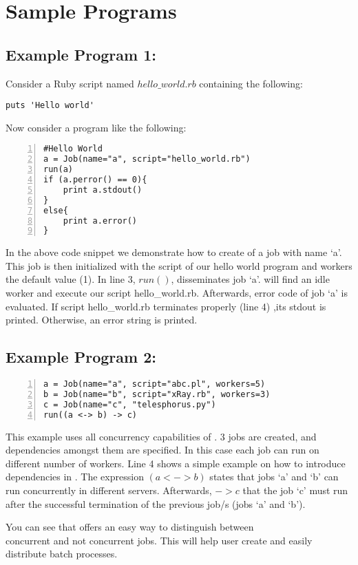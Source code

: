 \section{Sample Programs}
\label{sect:samples}
\subsection*{Example Program 1:}
Consider a Ruby script named $hello\_world.rb$ containing the following:
\begin{verbatim}
puts 'Hello world'
\end{verbatim}
Now consider a \lang{} program like the following:
\begin{Verbatim}[numbers=left]
#Hello World
a = Job(name="a", script="hello_world.rb")
run(a)
if (a.perror() == 0){
    print a.stdout()
}
else{
    print a.error()
}
\end{Verbatim}

In the above code snippet we demonstrate how to create of a job with name `a'.
This job is then initialized with the script of our hello world program and
workers the default value (1). In line 3, $run()$, disseminates job `a'. 
\lang{} will find an idle worker and execute our script hello\_world.rb.
Afterwards, error code of job `a' is evaluated. If script hello\_world.rb terminates properly (line 4)
,its stdout is printed. Otherwise, an error string is printed.

\subsection*{Example Program 2:}
\begin{Verbatim}[numbers=left]
a = Job(name="a", script="abc.pl", workers=5)
b = Job(name="b", script="xRay.rb", workers=3)
c = Job(name="c", "telesphorus.py")
run((a <-> b) -> c)
\end{Verbatim}

This example uses all concurrency capabilities of \lang{}.
3 jobs are created, and dependencies amongst them are specified.
In this case each job can run on different number of workers.
Line 4  shows a simple example on how to introduce dependencies in \lang{}.
The expression $(a <-> b)$ states that jobs `a' and `b' can
run concurrently in different servers. Afterwards,  $-> c$ that the job `c' must run after the successful termination
of the previous job/s (jobs `a' and `b').

You can see that \lang{} offers an easy way to distinguish between\\
concurrent and not concurrent jobs. This will help user create and easily distribute batch processes.\\
\\

